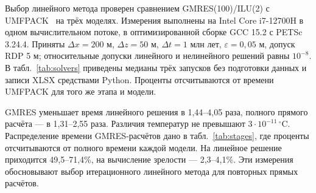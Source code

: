 
Выбор линейного метода проверен сравнением GMRES(100)/ILU(2)
с UMFPACK~\cite{suitesparse} на трёх моделях.
Измерения выполнены на Intel Core i7-12700H в одном вычислительном
потоке, в оптимизированной сборке GCC 15.2 с PETSc 3.24.4.
Приняты $\Delta x=200$ м, $\Delta z=50$ м,
$\Delta t=1$ млн лет, $\varepsilon=0{,}05$ м, допуск RDP 5 м;
относительные допуски линейного и нелинейного решений равны $10^{-8}$.
В табл.~\ref{tab:solvers} приведены медианы трёх запусков без
подготовки данных и записи XLSX средствами Python. Проценты
отсчитываются от времени UMFPACK для того же этапа и модели.

GMRES уменьшает время линейного решения в 1,44--4,05 раза,
полного прямого расчёта --- в 1,31--2,55 раза.
Различия температур не превышают $3\cdot10^{-11}\,{}^\circ$C.
Распределение времени GMRES-расчётов дано в табл.~\ref{tab:stages},
где проценты отсчитываются от полного времени каждой модели.
На линейное решение приходится 49,5--71,4\%, на вычисление зрелости ---
2,3--4,1\%. Эти измерения обосновывают выбор итерационного
линейного метода для повторных прямых расчётов.



